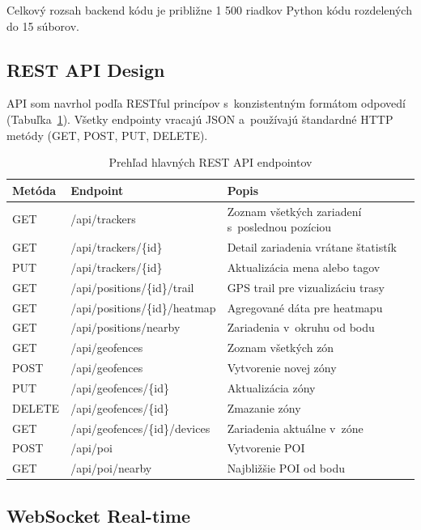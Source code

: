 Celkový rozsah backend kódu je približne 1 500 riadkov Python kódu rozdelených do 15 súborov.

\subsection{REST API Design}
\label{sec:RESTAPI}

API som navrhol podľa RESTful princípov s~konzistentným formátom odpovedí (Tabuľka~\ref{tab:endpoints}). Všetky endpointy vracajú JSON a~používajú štandardné HTTP metódy (GET, POST, PUT, DELETE).

\begin{table}[htbp]
    \centering
    \begin{tabular}{|l|l|p{5cm}|}
        \hline
        \textbf{Metóda} & \textbf{Endpoint} & \textbf{Popis} \\
        \hline
        GET & /api/trackers & Zoznam všetkých zariadení s~poslednou pozíciou \\
        GET & /api/trackers/\{id\} & Detail zariadenia vrátane štatistík \\
        PUT & /api/trackers/\{id\} & Aktualizácia mena alebo tagov \\
        GET & /api/positions/\{id\}/trail & GPS trail pre vizualizáciu trasy \\
        GET & /api/positions/\{id\}/heatmap & Agregované dáta pre heatmapu \\
        GET & /api/positions/nearby & Zariadenia v~okruhu od bodu \\
        GET & /api/geofences & Zoznam všetkých zón \\
        POST & /api/geofences & Vytvorenie novej zóny \\
        PUT & /api/geofences/\{id\} & Aktualizácia zóny \\
        DELETE & /api/geofences/\{id\} & Zmazanie zóny \\
        GET & /api/geofences/\{id\}/devices & Zariadenia aktuálne v~zóne \\
        POST & /api/poi & Vytvorenie POI \\
        GET & /api/poi/nearby & Najbližšie POI od bodu \\
        \hline
    \end{tabular}
    \caption{Prehľad hlavných REST API endpointov}
    \label{tab:endpoints}
\end{table}

\subsection{WebSocket Real-time}
\label{sec:WebSocket}


